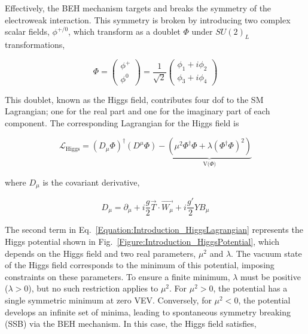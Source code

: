 Effectively, the BEH mechanism targets and breaks the symmetry of the electroweak interaction. This symmetry is broken by introducing two complex scalar fields, $\phi^{+/0}$, which transform as a doublet $\Phi$ under $SU(2)_L$ transformations,

\begin{equation}
\Phi =
\begin{pmatrix}
\phi^{+} \\
\phi^{0} 
\end{pmatrix}
= \frac{1}{\sqrt{2}} \begin{pmatrix}
    \phi_{1} + i\phi_{2} \\
    \phi_{3} + i\phi_{4}
\end{pmatrix}
\end{equation}

This doublet, known as the Higgs field, contributes four \ac{dof} to the SM Lagrangian; one for the real part and one for the imaginary part of each component. The corresponding Lagrangian for the Higgs field is

\begin{equation}
    \mathcal{L}_{\text{Higgs}} = (D_{\mu} \Phi)^{\dagger}(D^{\mu}\Phi) - \underbrace{(\mu^{2}\Phi^{\dagger}\Phi + \lambda(\Phi^{\dagger}\Phi)^2)}_{\text{V($\Phi$)}}
\label{Equation:Introduction_HiggsLagrangian}
\end{equation}

where $D_{\mu}$ is the covariant derivative,

\begin{equation}
    D_{\mu} = \partial_{\mu} + i\frac{g}{2}\vec{T}\cdot\vec{W_{\mu}} + i\frac{g'}{2}YB_{\mu}
\end{equation}

The second term in Eq.~\ref{Equation:Introduction_HiggsLagrangian} represents the Higgs potential shown in Fig.~\ref{Figure:Introduction_HiggsPotential}, which depends on the Higgs field and two real parameters, $\mu^{2}$ and $\lambda$. The vacuum state of the Higgs field corresponds to the minimum of this potential, imposing constraints on these parameters. To ensure a finite minimum, $\lambda$ must be positive ($\lambda > 0$), but no such restriction applies to $\mu^{2}$. For $\mu^{2} > 0$, the potential has a single symmetric minimum at zero \ac{VEV}. Conversely, for $\mu^{2} < 0$, the potential develops an infinite set of minima, leading to spontaneous symmetry breaking (SSB) via the BEH mechanism. In this case, the Higgs field satisfies,

